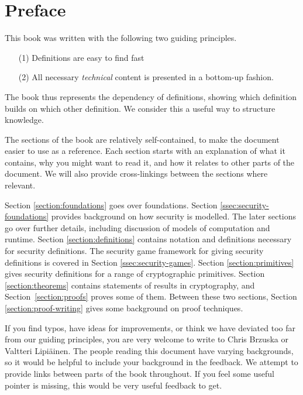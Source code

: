 \section*{Preface}
This book was written with the following two guiding principles.
\begin{itemize}
\item[(1)] Definitions are easy to find fast
\item[(2)] All necessary \emph{technical} content is presented in a bottom-up fashion. 
\end{itemize}
The book thus represents the dependency of definitions, showing which definition builds on which other definition. We consider this a useful way to structure knowledge.

The sections of the book are relatively self-contained, to make the document easier to use as a reference. Each section starts with an explanation of what it contains, why you might want to read it, and how it relates to other parts of the document. We will also provide cross-linkings between the sections where relevant.

Section \ref{section:foundations} goes over foundations. Section \ref{ssec:security-foundations} provides background on how security is modelled. The later sections go over further details, including discussion of models of computation and runtime. Section \ref{section:definitions} contains notation and definitions necessary for security definitions. The security game framework for giving security definitions is covered in Section \ref{ssec:security-games}. Section \ref{section:primitives} gives security definitions for a range of cryptographic primitives. Section \ref{section:theorems} contains statements of results in cryptography, and Section~\ref{section:proofs} proves some of them. Between these two sections, Section \ref{section:proof-writing} gives some background on proof techniques.

If you find typos, have ideas for improvements, or think we have deviated too far from our guiding principles, you are very welcome to write to Chris Brzuska or Valtteri Lipi{\"a}inen. The people reading this document have varying backgrounds, so it would be helpful to include your background in the feedback. We attempt to provide links between parts of the book throughout. If you feel some useful pointer is missing, this would be very useful feedback to get.